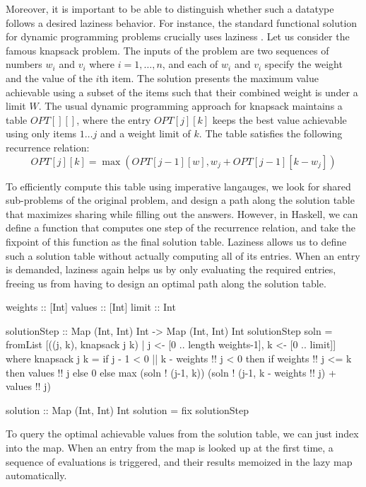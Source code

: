 \documentclass[acmsmall,review]{acmart}\settopmatter{}
\begin{document}
Moreover, it is important to be able to distinguish whether such a datatype
follows a desired laziness behavior. For instance, the standard functional
solution for dynamic programming problems crucially uses laziness . Let us consider the famous knapsack problem.
%
The inputs of the problem are two sequences of numbers $w_i$ and $v_i$
where $i = 1, \dots, n$, and each of $w_i$ and $v_i$ specify the
weight and the value of the $i$th item. The solution presents the
maximum value achievable using a subset of the items such that their
combined weight is under a limit $W$.
%
The usual dynamic programming approach for knapsack maintains a
table $OPT[][]$, where the entry $OPT[j][k]$ keeps the best value
achievable using only items $1\dots j$ and a weight limit of $k$. The
table satisfies the following recurrence relation: $$OPT[j][k]
= \max(OPT[j-1][w], w_j + OPT[j-1][k-w_j])$$

To efficiently compute this table using imperative langauges, we look
for shared sub-problems of the original problem, and design a path
along the solution table that maximizes sharing while filling out the
answers.
%
However, in Haskell, we can define a function that computes one step
of the recurrence relation, and take the fixpoint of this function as
the final solution table. Laziness allows us to define such a solution
table without actually computing all of its entries. When an entry is
demanded, laziness again helps us by only evaluating the required
entries, freeing us from having to design an optimal path along the
solution table.
%
\begin{inlinecode}
weights :: [Int]
values  :: [Int]
limit   :: Int

solutionStep :: Map (Int, Int) Int -> Map (Int, Int) Int
solutionStep soln =
  fromList [((j, k), knapsack j k) |
            j <- [0 .. length weights-1], k <- [0 .. limit]]
  where
    knapsack j k = if j - 1 < 0 || k - weights !! j < 0
                   then if weights !! j <= k then values !! j else 0
                   else max (soln ! (j-1, k))
                            (soln ! (j-1, k - weights !! j) + values !! j)

solution :: Map (Int, Int) Int
solution = fix solutionStep

\end{inlinecode}
%
To query the optimal achievable values from the solution table, we can
just index into the map. When an entry from the map is looked up at
the first time, a sequence of evaluations is triggered, and their
results memoized in the lazy map automatically.
\end{document}

